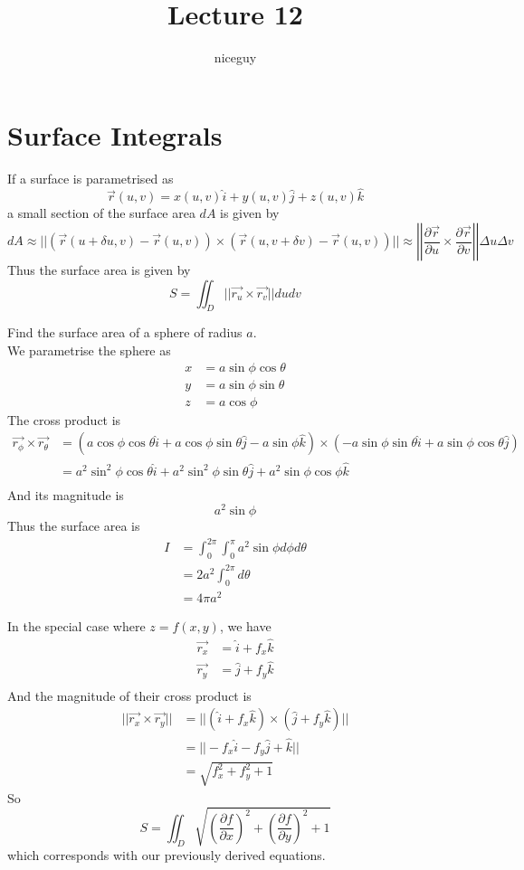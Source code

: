 \documentclass[12pt]{article}
\author{niceguy}
\title{Lecture 12}
\begin{document}
\maketitle

\section{Surface Integrals}

If a surface is parametrised as
$$\vec{r}(u,v) = x(u,v)\hat{i} + y(u,v)\hat{j} + z(u,v)\hat{k}$$
a small section of the surface area $dA$ is given by
$$dA \approx ||(\vec{r}(u+\delta u,v)-\vec{r}(u,v)) \times (\vec{r}(u,v+\delta v)-\vec{r}(u,v))|| \approx \left|\left|\frac{\partial \vec{r}}{\partial u} \times \frac{\partial \vec{r}}{\partial v}\right|\right|\Delta u \Delta v$$
Thus the surface area is given by
$$S = \iint_D ||\vec{r_u}\times\vec{r_v}||dudv$$

\begin{ex}
	Find the surface area of a sphere of radius $a$. \\
	We parametrise the sphere as
	\begin{align*}
		x &= a\sin\phi\cos\theta \\
		y &= a\sin\phi\sin\theta \\
		z &= a\cos\phi
	\end{align*}
	The cross product is
	\begin{align*}
		\vec{r_\phi}\times\vec{r_\theta} &= (a\cos\phi\cos\theta\hat{i} + a\cos\phi\sin\theta\hat{j} - a\sin\phi\hat{k}) \times (-a\sin\phi\sin\theta\hat{i} + a\sin\phi\cos\theta\hat{j}) \\
						 &= a^2\sin^2\phi\cos\theta\hat{i} + a^2\sin^2\phi\sin\theta\hat{j} + a^2\sin\phi\cos\phi\hat{k} \\
	\end{align*}
	And its magnitude is $$a^2\sin\phi$$
	Thus the surface area is
	\begin{align*}
		I &= \int_0^{2\pi} \int_0^\pi a^2\sin\phi d\phi d\theta \\
		  &= 2a^2 \int_0^{2\pi} d\theta \\
		  &= 4\pi a^2
	\end{align*}
\end{ex}

In the special case where $z = f(x,y)$, we have
\begin{align*}
	\vec{r_x} &= \hat{i} + f_x\hat{k} \\
	\vec{r_y} &= \hat{j} + f_y\hat{k} \\
\end{align*}
And the magnitude of their cross product is
\begin{align*}
	||\vec{r_x} \times \vec{r_y}|| &= ||(\hat{i} + f_x\hat{k}) \times (\hat{j} + f_y\hat{k})|| \\
				       &= ||-f_x\hat{i} -f_y\hat{j} + \hat{k}|| \\
				       &= \sqrt{f_x^2 + f_y^2 + 1}
\end{align*}
So
$$S = \iint_D \sqrt{\left(\frac{\partial f}{\partial x}\right)^2 + \left(\frac{\partial f}{\partial y}\right)^2 + 1}$$
which corresponds with our previously derived equations.
\end{document}
